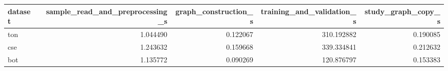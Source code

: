 \begin{tabular}{lrrrr}
\toprule
dataset & sample\_read\_and\_preprocessing\_s & graph\_construction\_s & training\_and\_validation\_s & study\_graph\_copy\_s \\
\midrule
ton & 1.044490 & 0.122067 & 310.192882 & 0.190085 \\
cse & 1.243632 & 0.159668 & 339.334841 & 0.212632 \\
bot & 1.135772 & 0.090269 & 120.876797 & 0.153383 \\
\bottomrule
\end{tabular}
